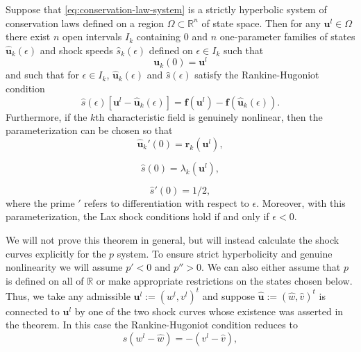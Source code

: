 \begin{Theorem}
\label{thm:shock-curves-existence}
Suppose that \eqref{eq:conservation-law-system} is a strictly hyperbolic system of conservation laws defined on a region $\Omega\subset\mathbb{R}^n$ of state space. Then for any $\bm{u}^l\in\Omega$ there exist $n$ open intervals $I_k$ containing $0$ and $n$ one-parameter families of states $\hat{\bm{u}}_k(\epsilon)$ and shock speeds $\hat s_k(\epsilon)$ defined on $\epsilon\in I_k$ such that
\begin{equation}\label{eq:shock-curve-base-state}
\bm{u}_k(0)=\bm{u}^l
\end{equation}
and such that for $\epsilon\in I_k$, $\hat{\bm{u}}_k(\epsilon)$ and $\hat s(\epsilon)$ satisfy the Rankine-Hugoniot condition
\[
\hat s(\epsilon)[\bm{u}^l-\hat{\bm{u}}_k(\epsilon)]=\bm{f}(\bm{u}^l)-\bm{f}(\hat{\bm{u}}_k(\epsilon)).
\]
Furthermore, if the $k$th characteristic field is genuinely nonlinear, then the parameterization can be chosen so that
\begin{equation}\label{eq:shock-curve-initial-tangent}
\hat{\bm{u}}_k'(0)=\bm{r}_k(\bm{u}^l),
\end{equation}

\begin{equation}\label{eq:shock-curve-initial-speed}
\hat s(0)=\lambda_k(\bm{u}^l),
\end{equation}

\begin{equation}\label{eq:shock-curve-initial-speed-derivative}
\hat s'(0)=1/2,
\end{equation}
where the prime $'$ refers to differentiation with respect to $\epsilon$. Moreover, with this parameterization, the Lax shock conditions hold if and only if $\epsilon<0$.
\end{Theorem}

We will not prove this theorem in general, but will instead calculate the shock curves explicitly for the $p$ system. To ensure strict hyperbolicity and genuine nonlinearity we will assume $p'<0$ and $p''>0$. We can also either assume that $p$ is defined on all of $\mathbb{R}$ or make appropriate restrictions on the states chosen below. Thus, we take any admissible $\bm{u}^l:=(w^l,v^l)^t$ and suppose $\hat{\bm{u}}:=(\hat w,\hat v)^t$ is connected to $\bm{u}^l$ by one of the two shock curves whose existence was asserted in the theorem. In this case the Rankine-Hugoniot condition reduces to
\begin{equation}\label{eq:p-system-shock-volume-rh}
s(w^l-\hat w)=-(v^l-\hat v),
\end{equation}

